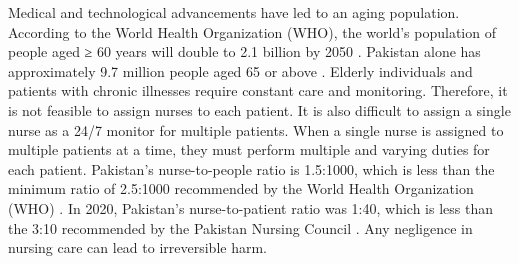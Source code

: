 Medical and technological advancements have led to an aging population. According to the World Health Organization (WHO), the world’s population of people aged ≥ 60 years will double to 2.1 billion by 2050 \cite{population}. 
Pakistan alone has approximately 9.7 million people aged 65 or above \cite{OldAgePop}. Elderly individuals and patients with chronic illnesses require constant care and monitoring. Therefore, it is not feasible to assign nurses to each patient. It is also difficult to assign a single nurse as a 24/7 monitor for multiple patients. When a single nurse is assigned to multiple patients at a time, they must perform multiple and varying duties for each patient. Pakistan’s nurse-to-people ratio is 1.5:1000, which is less than the minimum ratio of 2.5:1000 recommended by the World Health Organization (WHO) \cite{nursing}. In 2020, Pakistan's nurse-to-patient ratio was 1:40, which is less than the 3:10 recommended by the Pakistan Nursing Council \cite{NurseToPatient}. Any negligence in nursing care can lead to irreversible harm.

